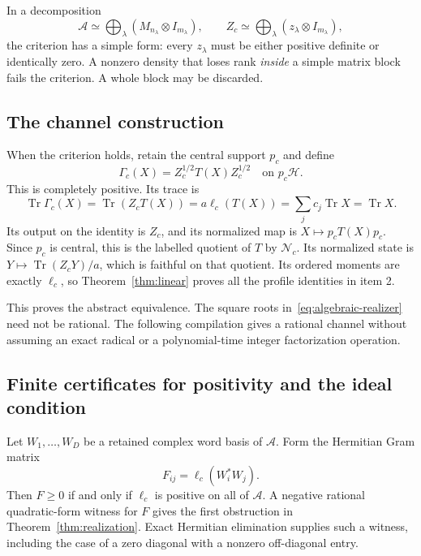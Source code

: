 \documentclass[11pt,a4paper]{article}
\theoremstyle{definition}\newtheorem{definition}[theorem]{Definition}
\newcommand{\Tr}{\operatorname{Tr}}
\newcommand{\Alg}{\mathcal A}
\newcommand{\Nul}{\mathcal N}
\begin{document}
In a decomposition
\begin{equation}\label{eq:blockdensity}
 \Alg\simeq\bigoplus_{\lambda}(M_{n_\lambda}\otimes I_{m_\lambda}),
 \qquad Z_c\simeq\bigoplus_\lambda(z_\lambda\otimes I_{m_\lambda}),
\end{equation}
the criterion has a simple form: every $z_\lambda$ must be either positive definite or identically zero. A nonzero density that loses rank \emph{inside} a simple matrix block fails the criterion. A whole block may be discarded.

\subsection{The channel construction}

When the criterion holds, retain the central support $p_c$ and define
\begin{equation}\label{eq:algebraic-realizer}
 \Gamma_c(X)=Z_c^{1/2}T(X)Z_c^{1/2}
 \quad\text{on }p_c\mathcal H.
\end{equation}
This is completely positive. Its trace is
\[
 \Tr\Gamma_c(X)=\Tr(Z_cT(X))
 =a\ell_c(T(X))
 =\sum_jc_j\Tr X=\Tr X.
\]
Its output on the identity is $Z_c$, and its normalized map is $X\mapsto p_cT(X)p_c$. Since $p_c$ is central, this is the labelled quotient of $T$ by $\Nul_c$. Its normalized state is $Y\mapsto\Tr(Z_cY)/a$, which is faithful on that quotient. Its ordered moments are exactly $\ell_c$, so Theorem~\ref{thm:linear} proves all the profile identities in item 2.

This proves the abstract equivalence. The square roots in~\eqref{eq:algebraic-realizer} need not be rational. The following compilation gives a rational channel without assuming an exact radical or a polynomial-time integer factorization operation.

\subsection{Finite certificates for positivity and the ideal condition}

Let $W_1,\ldots,W_D$ be a retained complex word basis of $\Alg$. Form the Hermitian Gram matrix
\begin{equation}\label{eq:positivegram}
 F_{ij}=\ell_c(W_i^*W_j).
\end{equation}
Then $F\ge0$ if and only if $\ell_c$ is positive on all of $\Alg$. A negative rational quadratic-form witness for $F$ gives the first obstruction in Theorem~\ref{thm:realization}. Exact Hermitian elimination supplies such a witness, including the case of a zero diagonal with a nonzero off-diagonal entry.
\end{document}

